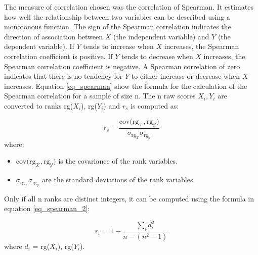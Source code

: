 The measure of correlation chosen was the correlation of Spearman. It estimates how well the relationship between two variables can be described using a monotonous function. The sign of the Spearman correlation indicates the direction of association between $X$ (the independent variable) and $Y$ (the dependent variable). If $Y$ tends to increase when $X$ increases, the Spearman correlation coefficient is positive. If $Y$ tends to decrease when $X$ increases, the Spearman correlation coefficient is negative. A Spearman correlation of zero indicates that there is no tendency for $Y$ to either increase or decrease when $X$ increases.
Equation \ref{eq_spearman} show the formula for the calculation of the Spearman correlation for a sample of size n. The n raw scores $X_i, Y_i$ are converted to ranks rg($X_i$), rg($Y_i$) and $\mathit{r_s}$ is computed as:

\begin{equation}\label{eq_spearman}
\mathit{r_s} = \frac{\mathrm{cov(\mathrm{rg_\mathcal{X}}, \mathrm{rg_\mathcal{Y}}})}{\sigma_{\mathrm{rg_\mathcal{X}}}\sigma_{\mathrm{rg_\mathcal{Y}}}}
\end{equation}
where:

\begin{itemize}
    \item $\mathrm{cov(\mathrm{rg_\mathcal{X}},\mathrm{rg_\mathcal{Y}}})$ is the covariance of the rank variables.
    \item $\sigma_{\mathrm{rg_\mathcal{X}}}\sigma_{\mathrm{rg_\mathcal{Y}}}$ are the standard deviations of the rank variables.
\end{itemize}
Only if all n ranks are distinct integers, it can be computed using the formula in equation \ref{eq_spearman_2}:

\begin{equation}\label{eq_spearman_2}
\mathit{r_s} = 1 - \frac{\sum_{i} d^2_i}{n-(n^2-1)}
\end{equation}
where $d_i$ = rg($X_i$), rg($Y_i$).

